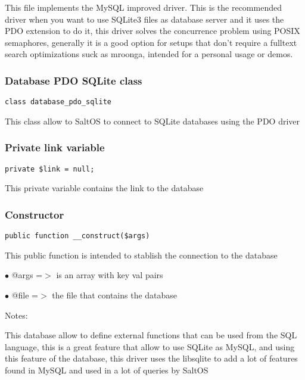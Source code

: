 \documentclass[a4paper]{article}
\begin{document}
This file implements the MySQL improved driver. This is the recommended driver when you want
to use SQLite3 files as database server and it uses the PDO extension to do it, this driver
solves the concurrence problem using POSIX semaphores, generally it is a good option for setups
that don't require a fulltext search optimizations suck as mroonga, intended for a personal
usage or demos.

\hypertarget{toc346}{}
\subsubsection{Database PDO SQLite class}

\begin{lstlisting}
class database_pdo_sqlite
\end{lstlisting}

This class allow to SaltOS to connect to SQLite databases using the PDO driver

\hypertarget{toc347}{}
\subsubsection{Private link variable}

\begin{lstlisting}
private $link = null;
\end{lstlisting}

This private variable contains the link to the database

\hypertarget{toc348}{}
\subsubsection{Constructor}

\begin{lstlisting}
public function __construct($args)
\end{lstlisting}

This public function is intended to stablish the connection to the database

\begin{compactitem}
\item[\color{myblue}$\bullet$] @args =$>$ is an array with key val pairs
\item[\color{myblue}$\bullet$] @file =$>$ the file that contains the database
\end{compactitem}

Notes:

This database allow to define external functions that can be used from the SQL language,
this is a great feature that allow to use SQLite as MySQL, and using this feature of the
database, this driver uses the libsqlite to add a lot of features found in MySQL and
used in a lot of queries by SaltOS
\end{document}
